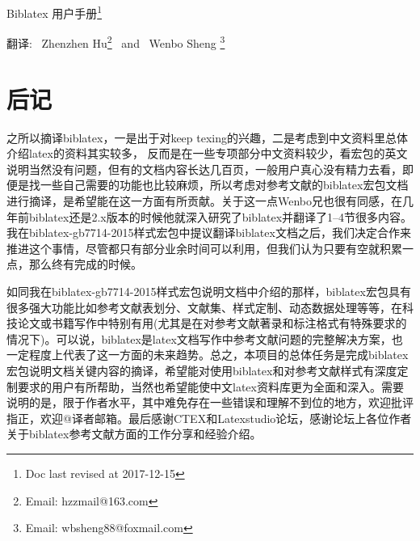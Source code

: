 \documentclass{ltxdockit}[2011/03/25]
\begin{document}
\printtitlepage

\begin{trivlist}\item\relax
{\hfill\heiti{}Biblatex 用户手册\footnote{Doc last revised at 2017-12-15}\hfill\hspace*{1pt}}\par
{\hfill\fangsong{}翻译:~ Zhenzhen Hu\footnote{Email: hzzmail@163.com} ~and~ %
    	Wenbo Sheng \footnote{Email: wbsheng88@foxmail.com}\hfill\hspace*{2.5cm}}\par
{\hfill\kaiti{}\hfill\hspace*{0.5cm}}\par
\end{trivlist}
\renewcommand{\contentsname}{目录}
\renewcommand{\listtablename}{表格}
\tableofcontents
\listoftables











\printglossary[type=trans,style=longragged3colborder,nopostdot=true,nogroupskip]%

\section{后记}

\setlength{\parskip}{2mm}\setlength{\itemindent}{2em}

之所以摘译biblatex，一是出于对keep texing的兴趣，二是考虑到中文资料里总体介绍latex的资料其实较多，
反而是在一些专项部分中文资料较少，看宏包的英文说明当然没有问题，但有的文档内容长达几百页，一般用户真心没有精力去看，即便是找一些自己需要的功能也比较麻烦，所以考虑对参考文献的biblatex宏包文档进行摘译，是希望能在这一方面有所贡献。关于这一点Wenbo兄也很有同感，在几年前biblatex还是2.x版本的时候他就深入研究了biblatex并翻译了1--4节很多内容。我在biblatex-gb7714-2015样式宏包中提议翻译biblatex文档之后，我们决定合作来推进这个事情，尽管都只有部分业余时间可以利用，但我们认为只要有空就积累一点，那么终有完成的时候。

如同我在biblatex-gb7714-2015样式宏包说明文档中介绍的那样，biblatex宏包具有很多强大功能比如参考文献表划分、文献集、样式定制、动态数据处理等等，在科技论文或书籍写作中特别有用(尤其是在对参考文献著录和标注格式有特殊要求的情况下)。可以说，biblatex是latex文档写作中参考文献问题的完整解决方案，也一定程度上代表了这一方面的未来趋势。总之，本项目的总体任务是完成biblatex宏包说明文档关键内容的摘译，希望能对使用biblatex和对参考文献样式有深度定制要求的用户有所帮助，当然也希望能使中文latex资料库更为全面和深入。需要说明的是，限于作者水平，其中难免存在一些错误和理解不到位的地方，欢迎批评指正，欢迎@译者邮箱。最后感谢CTEX和Latexstudio论坛，感谢论坛上各位作者关于biblatex参考文献方面的工作分享和经验介绍。
\end{document}
